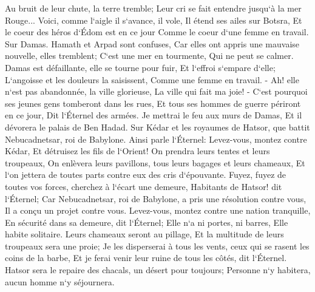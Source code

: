 \verse Au bruit de leur chute, la terre tremble; Leur cri se fait entendre jusqu`à la mer Rouge... 
\verse Voici, comme l`aigle il s`avance, il vole, Il étend ses ailes sur Botsra, Et le coeur des héros d`Édom est en ce jour Comme le coeur d`une femme en travail. 
\verse Sur Damas. Hamath et Arpad sont confuses, Car elles ont appris une mauvaise nouvelle, elles tremblent; C`est une mer en tourmente, Qui ne peut se calmer. 
\verse Damas est défaillante, elle se tourne pour fuir, Et l`effroi s`empare d`elle; L`angoisse et les douleurs la saisissent, Comme une femme en travail. - 
\verse Ah! elle n`est pas abandonnée, la ville glorieuse, La ville qui fait ma joie! - 
\verse C`est pourquoi ses jeunes gens tomberont dans les rues, Et tous ses hommes de guerre périront en ce jour, Dit l`Éternel des armées. 
\verse Je mettrai le feu aux murs de Damas, Et il dévorera le palais de Ben Hadad. 
\verse Sur Kédar et les royaumes de Hatsor, que battit Nebucadnetsar, roi de Babylone. Ainsi parle l`Éternel: Levez-vous, montez contre Kédar, Et détruisez les fils de l`Orient! 
\verse On prendra leurs tentes et leurs troupeaux, On enlèvera leurs pavillons, tous leurs bagages et leurs chameaux, Et l`on jettera de toutes parts contre eux des cris d`épouvante. 
\verse Fuyez, fuyez de toutes vos forces, cherchez à l`écart une demeure, Habitants de Hatsor! dit l`Éternel; Car Nebucadnetsar, roi de Babylone, a pris une résolution contre vous, Il a conçu un projet contre vous. 
\verse Levez-vous, montez contre une nation tranquille, En sécurité dans sa demeure, dit l`Éternel; Elle n`a ni portes, ni barres, Elle habite solitaire. 
\verse Leurs chameaux seront au pillage, Et la multitude de leurs troupeaux sera une proie; Je les disperserai à tous les vents, ceux qui se rasent les coins de la barbe, Et je ferai venir leur ruine de tous les côtés, dit l`Éternel. 
\verse Hatsor sera le repaire des chacals, un désert pour toujours; Personne n`y habitera, aucun homme n`y séjournera. 
